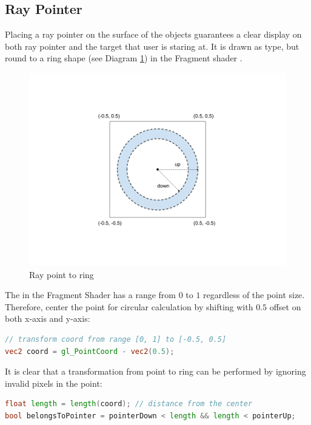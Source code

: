 \subsection{Ray Pointer}
\label{section:ray-pointer}

Placing a ray pointer on the surface of the objects guarantees a clear display on both ray pointer and the target that user is staring at. It is drawn as  type, but round to a ring shape (see Diagram \ref{fig:ray-point2ring}) in the Fragment shader \cite{wiki.fragment-shader.2016}.

\begin{figure}[H]
\caption{Ray point to ring}
\label{fig:ray-point2ring}
\centering
\includegraphics[width=\textwidth, keepaspectratio]{Figures/ray-point2ring.png}
\decoRule
\end{figure}

The  in the Fragment Shader has a range from $0$ to $1$ regardless of the point size. Therefore, center the point for circular calculation by shifting with $0.5$ offset on both x-axis and y-axis:

\begin{lstlisting}[language=Glsl]
// transform coord from range [0, 1] to [-0.5, 0.5]
vec2 coord = gl_PointCoord - vec2(0.5);
\end{lstlisting}

It is clear that a transformation from point to ring can be performed by ignoring invalid pixels in the point:

\begin{lstlisting}[language=Glsl]
float length = length(coord); // distance from the center
bool belongsToPointer = pointerDown < length && length < pointerUp;
\end{lstlisting}

